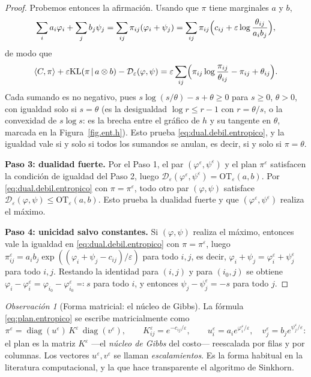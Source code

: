 \documentclass[12pt, a4paper]{amsbook}
\theoremstyle{remark}
\newtheorem{obs}[teo]{Observación}
\theoremstyle{definition}
\numberwithin{section}{chapter}
\numberwithin{subsection}{section}
\numberwithin{equation}{section}
\numberwithin{figure}{chapter}
\begin{document}
\begin{proof}
Probemos entonces la afirmación. Usando que
$\pi$ tiene marginales $a$ y $b$,
\[
\sum_ia_i\varphi_i+\sum_jb_j\psi_j=\sum_{ij}\pi_{ij}(\varphi_i+\psi_j)
=\sum_{ij}\pi_{ij}\Bigl(c_{ij}+\varepsilon\log\frac{\theta_{ij}}{a_ib_j}\Bigr),
\]
de modo que
\[
\langle C,\pi\rangle+\varepsilon\mathrm{KL}(\pi\,|\,a\otimes b)-\mathcal D_\varepsilon(\varphi,\psi)
=\varepsilon\sum_{ij}\Bigl(\pi_{ij}\log\frac{\pi_{ij}}{\theta_{ij}}-\pi_{ij}+\theta_{ij}\Bigr).
\]
Cada sumando es no negativo, pues $s\log(s/\theta)-s+\theta\ge0$ para
$s\ge0$, $\theta>0$, con igualdad solo si $s=\theta$ (es la desigualdad
$\log r\le r-1$ con $r=\theta/s$, o la convexidad de $s\log s$: es la brecha
entre el gráfico de $h$ y su tangente en $\theta$, marcada en la
Figura~\ref{fig.ent.h}). Esto prueba
\eqref{eq:dual.debil.entropico}, y la igualdad vale si y solo si todos los
sumandos se anulan, es decir, si y solo si $\pi=\theta$.

\medskip
\textbf{Paso 3: dualidad fuerte.}
Por el Paso 1, el par $(\varphi^\varepsilon,\psi^\varepsilon)$ y el plan
$\pi^\varepsilon$ satisfacen la condición de igualdad del Paso 2, luego
$\mathcal D_\varepsilon(\varphi^\varepsilon,\psi^\varepsilon)=\mathrm{OT}_\varepsilon(a,b)$.
Por \eqref{eq:dual.debil.entropico} con $\pi=\pi^\varepsilon$, todo otro par
$(\varphi,\psi)$ satisface $\mathcal D_\varepsilon(\varphi,\psi)\le\mathrm{OT}_\varepsilon(a,b)$.
Esto prueba la dualidad fuerte y que $(\varphi^\varepsilon,\psi^\varepsilon)$
realiza el máximo.

\medskip
\textbf{Paso 4: unicidad salvo constantes.}
Si $(\varphi,\psi)$ realiza el máximo, entonces vale la igualdad en
\eqref{eq:dual.debil.entropico} con $\pi=\pi^\varepsilon$, luego
$\pi^\varepsilon_{ij}=a_ib_j\exp((\varphi_i+\psi_j-c_{ij})/\varepsilon)$ para
todo $i,j$, es decir, $\varphi_i+\psi_j=\varphi^\varepsilon_i+\psi^\varepsilon_j$
para todo $i,j$. Restando la identidad para $(i,j)$ y para $(i_0,j)$ se
obtiene $\varphi_i-\varphi^\varepsilon_i=\varphi_{i_0}-\varphi^\varepsilon_{i_0}\eqqcolon s$
para todo $i$, y entonces $\psi_j-\psi^\varepsilon_j=-s$ para todo $j$.
\end{proof}

\begin{obs}[Forma matricial: el núcleo de Gibbs]\label{obs.notacion.peyre}
La fórmula \eqref{eq:plan.entropico} se escribe matricialmente como
\[
\pi^\varepsilon=\operatorname{diag}(u^\varepsilon)\,K^\varepsilon\,\operatorname{diag}(v^\varepsilon),
\qquad
K^\varepsilon_{ij}=e^{-c_{ij}/\varepsilon},
\qquad
u^\varepsilon_i=a_ie^{\varphi^\varepsilon_i/\varepsilon},
\quad
v^\varepsilon_j=b_je^{\psi^\varepsilon_j/\varepsilon}:
\]
el plan es la matriz $K^\varepsilon$ —el \emph{núcleo de Gibbs} del costo—
reescalada por filas y por columnas. Los vectores
$u^\varepsilon,v^\varepsilon$ se llaman \emph{escalamientos}. Es la forma
habitual en la literatura computacional, y la que hace transparente el
algoritmo de Sinkhorn.
\end{obs}
\end{document}
